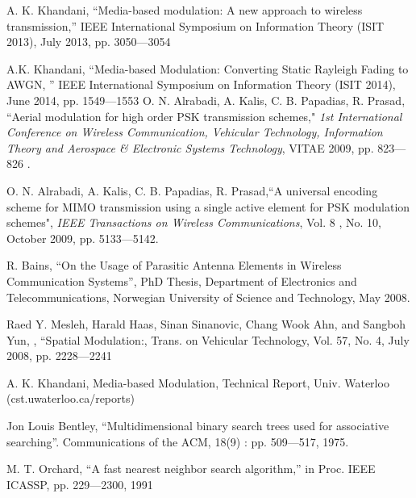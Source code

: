 \begin{thebibliography}{100}

 A. K. Khandani,
“Media-based modulation: A new approach to wireless transmission,”
IEEE International Symposium on Information Theory (ISIT 2013), July 2013, pp. 3050---3054

 A.K. Khandani,
“Media-based Modulation: Converting Static Rayleigh Fading to AWGN, ”
IEEE International Symposium on Information Theory (ISIT 2014), June 2014, pp. 1549---1553
 	O. N. Alrabadi, A. Kalis, C. B. Papadias, R. Prasad, ``Aerial  modulation for high order PSK transmission schemes," {\em 1st International Conference on Wireless Communication, Vehicular Technology, Information Theory and Aerospace \& Electronic Systems Technology}, VITAE 2009, pp. 823---826 .

	O. N. Alrabadi, A. Kalis, C. B. Papadias, R. Prasad,``A universal encoding scheme for MIMO transmission using a single active element for PSK modulation schemes", {\em IEEE Transactions on Wireless Communications}, Vol. 8 , No. 10, October 2009, pp. 5133---5142.

	R. Bains, ``On the Usage of Parasitic Antenna Elements in Wireless Communication Systems'', PhD Thesis, Department of Electronics and Telecommunications, Norwegian University of Science and Technology, May 2008.


Raed Y. Mesleh, Harald Haas, Sinan Sinanovic, Chang Wook Ahn,  and Sangboh Yun, , ``Spatial Modulation:,
Trans. on Vehicular Technology, Vol. 57, No. 4, July 2008, pp. 2228---2241	

 A. K. Khandani, Media-based Modulation, Technical Report, Univ. Waterloo (cst.uwaterloo.ca/reports)

 Jon Louis Bentley,
 “Multidimensional binary search trees used for associative searching”. Communications of the ACM, 18(9) : pp. 509---517, 1975.



 M. T. Orchard, “A fast nearest neighbor search algorithm,” in Proc.
IEEE ICASSP, pp. 229---2300, 1991


\end{thebibliography}
